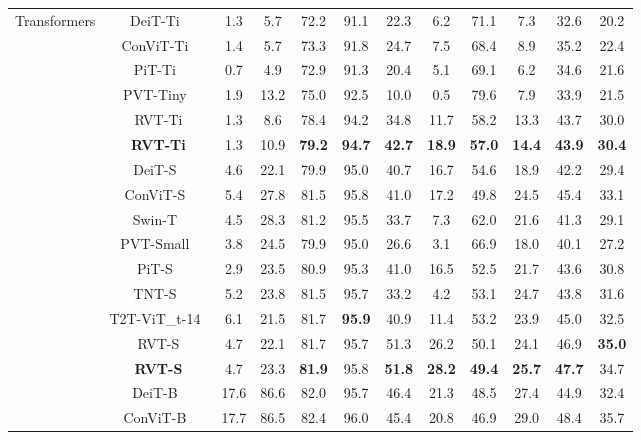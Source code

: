 \documentclass[10pt,twocolumn,letterpaper]{article}
\begin{document}
\begin{table*}
{\begin{tabular}{c|c|cc|cc|cccccc}
\midrule
        \multirow{24}{*}{Transformers}& DeiT-Ti~\cite{touvron2020training} & 1.3 & 5.7 & 72.2 & 91.1 & 22.3 & 6.2 & 71.1 & 7.3 & 32.6 & 20.2 \\
        & ConViT-Ti~\cite{d2021convit} & 1.4 & 5.7 & 73.3 & 91.8 & 24.7 & 7.5 & 68.4 & 8.9 & 35.2 & 22.4 \\
        & PiT-Ti~\cite{heo2021rethinking} & 0.7 & 4.9 & 72.9 & 91.3 & 20.4 & 5.1 & 69.1 & 6.2 & 34.6 & 21.6 \\
        & PVT-Tiny~\cite{wang2021pyramid} & 1.9 & 13.2 & 75.0 & 92.5 & 10.0 & 0.5 & 79.6 & 7.9 & 33.9 & 21.5 \\
        & RVT-Ti & 1.3 & 8.6 & 78.4 & 94.2 & 34.8 & 11.7 & 58.2 & 13.3 & 43.7 & 30.0 \\
        & \textbf{RVT-Ti} & 1.3 & 10.9 & \textbf{79.2} & \textbf{94.7} & \textbf{42.7} & \textbf{18.9} & \textbf{57.0} & \textbf{14.4} & \textbf{43.9} & \textbf{30.4} \\
         \cmidrule{2-12}
        & DeiT-S~\cite{touvron2020training} & 4.6 & 22.1 & 79.9 & 95.0 & 40.7 & 16.7 & 54.6 & 18.9 & 42.2 & 29.4 \\
        & ConViT-S~\cite{d2021convit} & 5.4 & 27.8 & 81.5 & 95.8 & 41.0 & 17.2 & 49.8 & 24.5 & 45.4 & 33.1 \\
        & Swin-T~\cite{liu2021swin} & 4.5 & 28.3 & 81.2 & 95.5 & 33.7 & 7.3 & 62.0 & 21.6 & 41.3 & 29.1 \\
        & PVT-Small~\cite{wang2021pyramid} & 3.8 & 24.5 & 79.9 & 95.0 & 26.6 & 3.1 & 66.9 & 18.0 & 40.1 & 27.2 \\
        & PiT-S~\cite{heo2021rethinking} & 2.9 & 23.5 & 80.9 & 95.3 & 41.0 & 16.5 & 52.5 & 21.7 & 43.6 & 30.8 \\
& TNT-S~\cite{han2021transformer} & 5.2 & 23.8 & 81.5 & 95.7 & 33.2 & 4.2 & 53.1 & 24.7 & 43.8 & 31.6 \\
        & T2T-ViT\_t-14~\cite{yuan2021tokens} & 6.1 & 21.5 & 81.7 & \textbf{95.9} & 40.9 & 11.4 & 53.2 & 23.9 & 45.0 & 32.5 \\
        & RVT-S & 4.7 & 22.1 & 81.7 & 95.7 & 51.3 & 26.2 & 50.1 & 24.1 & 46.9 & \textbf{35.0} \\
        & \textbf{RVT-S} & 4.7 & 23.3 & \textbf{81.9} & 95.8 & \textbf{51.8} & \textbf{28.2} & \textbf{49.4} & \textbf{25.7} & \textbf{47.7} & 34.7  \\
        \cmidrule{2-12}
        & DeiT-B~\cite{touvron2020training} & 17.6 & 86.6 & 82.0 & 95.7 & 46.4 & 21.3 & 48.5 & 27.4 & 44.9 & 32.4 \\
        & ConViT-B~\cite{d2021convit} & 17.7 & 86.5 & 82.4 & 96.0 & 45.4 & 20.8 & 46.9 & 29.0 & 48.4 & 35.7 \\

\end{tabular}}
\end{table*}
\end{document}
